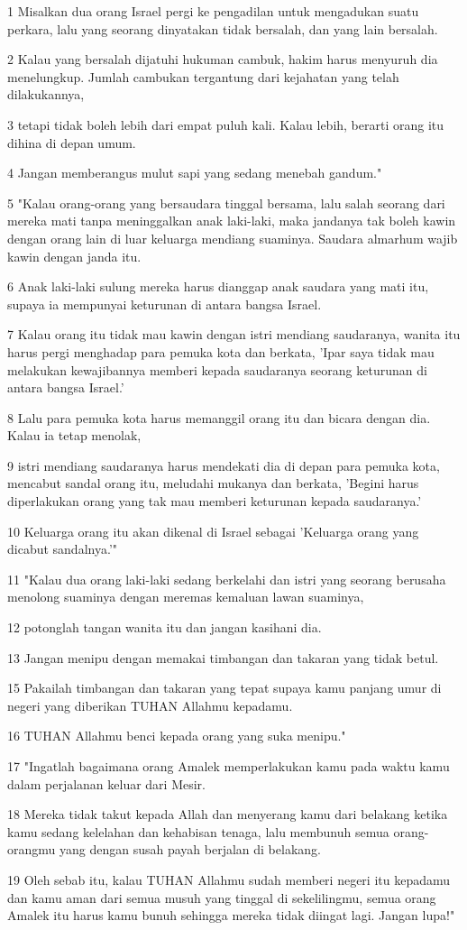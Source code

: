 \par 1 Misalkan dua orang Israel pergi ke pengadilan untuk mengadukan suatu perkara, lalu yang seorang dinyatakan tidak bersalah, dan yang lain bersalah.
\par 2 Kalau yang bersalah dijatuhi hukuman cambuk, hakim harus menyuruh dia menelungkup. Jumlah cambukan tergantung dari kejahatan yang telah dilakukannya,
\par 3 tetapi tidak boleh lebih dari empat puluh kali. Kalau lebih, berarti orang itu dihina di depan umum.
\par 4 Jangan memberangus mulut sapi yang sedang menebah gandum."
\par 5 "Kalau orang-orang yang bersaudara tinggal bersama, lalu salah seorang dari mereka mati tanpa meninggalkan anak laki-laki, maka jandanya tak boleh kawin dengan orang lain di luar keluarga mendiang suaminya. Saudara almarhum wajib kawin dengan janda itu.
\par 6 Anak laki-laki sulung mereka harus dianggap anak saudara yang mati itu, supaya ia mempunyai keturunan di antara bangsa Israel.
\par 7 Kalau orang itu tidak mau kawin dengan istri mendiang saudaranya, wanita itu harus pergi menghadap para pemuka kota dan berkata, 'Ipar saya tidak mau melakukan kewajibannya memberi kepada saudaranya seorang keturunan di antara bangsa Israel.'
\par 8 Lalu para pemuka kota harus memanggil orang itu dan bicara dengan dia. Kalau ia tetap menolak,
\par 9 istri mendiang saudaranya harus mendekati dia di depan para pemuka kota, mencabut sandal orang itu, meludahi mukanya dan berkata, 'Begini harus diperlakukan orang yang tak mau memberi keturunan kepada saudaranya.'
\par 10 Keluarga orang itu akan dikenal di Israel sebagai 'Keluarga orang yang dicabut sandalnya.'"
\par 11 "Kalau dua orang laki-laki sedang berkelahi dan istri yang seorang berusaha menolong suaminya dengan meremas kemaluan lawan suaminya,
\par 12 potonglah tangan wanita itu dan jangan kasihani dia.
\par 13 Jangan menipu dengan memakai timbangan dan takaran yang tidak betul.
\par 15 Pakailah timbangan dan takaran yang tepat supaya kamu panjang umur di negeri yang diberikan TUHAN Allahmu kepadamu.
\par 16 TUHAN Allahmu benci kepada orang yang suka menipu."
\par 17 "Ingatlah bagaimana orang Amalek memperlakukan kamu pada waktu kamu dalam perjalanan keluar dari Mesir.
\par 18 Mereka tidak takut kepada Allah dan menyerang kamu dari belakang ketika kamu sedang kelelahan dan kehabisan tenaga, lalu membunuh semua orang-orangmu yang dengan susah payah berjalan di belakang.
\par 19 Oleh sebab itu, kalau TUHAN Allahmu sudah memberi negeri itu kepadamu dan kamu aman dari semua musuh yang tinggal di sekelilingmu, semua orang Amalek itu harus kamu bunuh sehingga mereka tidak diingat lagi. Jangan lupa!"

